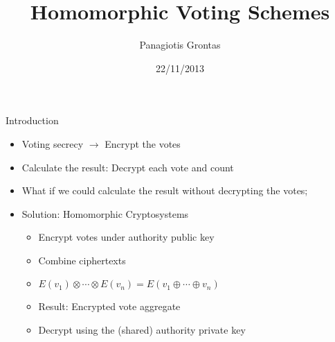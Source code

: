 \documentclass{beamer}
\title{Homomorphic Voting Schemes}
\author{Panagiotis Grontas}
\date{22/11/2013}
\institute{$\mu\Pi\lambda\forall$  - CoReLab Crypto Group}
\begin{document}
\begin{frame}
\titlepage
\end{frame}

\begin{frame}{Introduction}
\begin{itemize}
\item Voting secrecy $\rightarrow$ Encrypt the votes
\item Calculate the result: Decrypt each vote and count
\item What if we could calculate the result without decrypting the votes;
\item Solution: Homomorphic Cryptosystems
\begin{itemize}
\item Encrypt votes under authority public key
\item Combine ciphertexts
\item $ E(v_1) \otimes \cdots \otimes E(v_n) = E(v_1 \oplus \cdots \oplus v_n) $
\item Result: Encrypted vote aggregate
\item Decrypt using the (shared) authority private key
\end{itemize}
\end{itemize}
\end{frame}
\end{document}
